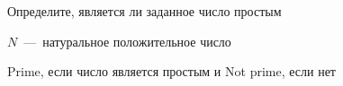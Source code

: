 Определите, является ли заданное число простым

\InputFile

$N$~---~натуральное положительное число

\OutputFile

Prime, если число является простым и Not prime, если нет

\SAMPLES


